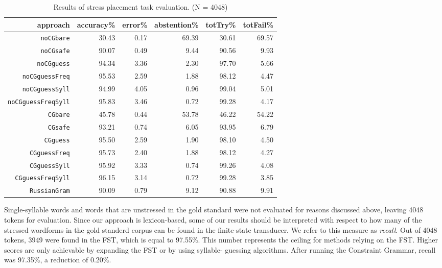 \documentclass[11pt]{article}
\begin{document}
\begin{table*}[t]
  \centering
  \begin{tabular}{r | r r r | r r }
    approach & accuracy\% & error\% & abstention\% & totTry\% & totFail\% \\
    \hline
    \hline
    {\small {\tt noCGbare}} & 30.43 & 0.17 & 69.39 & 30.61 & 69.57 \\
    {\small {\tt noCGsafe}} & 90.07 & 0.49 & 9.44 & 90.56 & 9.93 \\
    {\small {\tt noCGguess}} & 94.34 & 3.36 & 2.30 & 97.70 & 5.66 \\
    {\small {\tt noCGguessFreq}} & 95.53 & 2.59 & 1.88 & 98.12 & 4.47 \\
    {\small {\tt noCGguessSyll}} & 94.99 & 4.05 & 0.96 & 99.04 & 5.01 \\
    {\small {\tt noCGguessFreqSyll}} & 95.83 & 3.46 & 0.72 & 99.28 & 4.17 \\
    \hline
    {\small {\tt CGbare}} & 45.78 & 0.44 & 53.78 & 46.22 & 54.22 \\
    {\small {\tt CGsafe}} & 93.21 & 0.74 & 6.05 & 93.95 & 6.79 \\
    {\small {\tt CGguess}} & 95.50 & 2.59 & 1.90 & 98.10 & 4.50 \\
    {\small {\tt CGguessFreq}} & 95.73 & 2.40 & 1.88 & 98.12 & 4.27 \\
    {\small {\tt CGguessSyll}} & 95.92 & 3.33 & 0.74 & 99.26 & 4.08 \\
    {\small {\tt CGguessFreqSyll}} & 96.15 & 3.14 & 0.72 & 99.28 & 3.85 \\
    \hline
    {\small {\tt RussianGram}} & 90.09 & 0.79 & 9.12 & 90.88 & 9.91
  \end{tabular}
  \caption{Results of stress placement task evaluation. (N = 4048)}
  \label{tab:results}
\end{table*}

Single-syllable words and words that are unstressed in the gold standard were
not evaluated for reasons discussed above, leaving 4048 tokens for evaluation.
Since our approach is lexicon-based, some of our results should be interpreted
with respect to how many of the stressed wordforms in the gold standerd corpus
can be found in the finite-state transducer. We refer to this measure as 
\emph{recall}. Out of 4048 tokens, 3949 were 
found in the FST, which is equal to 97.55\%.
This number represents the ceiling for methods relying on the FST.
Higher scores are only achievable by expanding the FST or by using syllable-
guessing algorithms. After running the Constraint Grammar, recall was 97.35\%, 
a reduction of 0.20\%.
\end{document}
